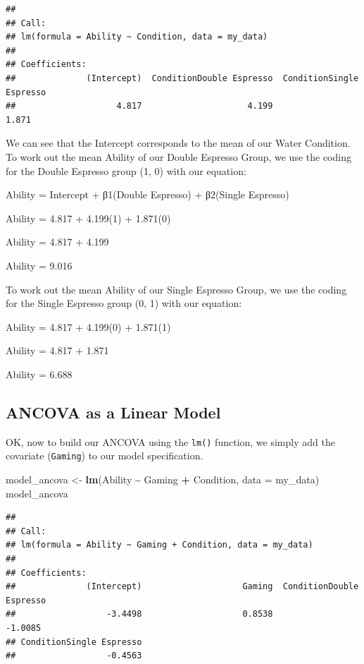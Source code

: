 \documentclass[
]{book}
\newenvironment{Shaded}{\begin{snugshade}}{\end{snugshade}}
\newcommand{\AttributeTok}[1]{\textcolor[rgb]{0.13,0.29,0.53}{#1}}
\newcommand{\FunctionTok}[1]{\textcolor[rgb]{0.13,0.29,0.53}{\textbf{#1}}}
\newcommand{\NormalTok}[1]{#1}
\newcommand{\OtherTok}[1]{\textcolor[rgb]{0.56,0.35,0.01}{#1}}
\newcommand{\SpecialCharTok}[1]{\textcolor[rgb]{0.81,0.36,0.00}{\textbf{#1}}}
\begin{document}
\begin{verbatim}
## 
## Call:
## lm(formula = Ability ~ Condition, data = my_data)
## 
## Coefficients:
##              (Intercept)  ConditionDouble Espresso  ConditionSingle Espresso  
##                    4.817                     4.199                     1.871
\end{verbatim}

We can see that the Intercept corresponds to the mean of our Water Condition. To work out the mean Ability of our Double Espresso Group, we use the coding for the Double Espresso group (1, 0) with our equation:

Ability = Intercept + β1(Double Espresso) + β2(Single Espresso)

Ability = 4.817 + 4.199(1) + 1.871(0)

Ability = 4.817 + 4.199

Ability = 9.016

To work out the mean Ability of our Single Espresso Group, we use the coding for the Single Espresso group (0, 1) with our equation:

Ability = 4.817 + 4.199(0) + 1.871(1)

Ability = 4.817 + 1.871

Ability = 6.688

\hypertarget{ancova-as-a-linear-model}{%
\subsection{ANCOVA as a Linear Model}\label{ancova-as-a-linear-model}}

OK, now to build our ANCOVA using the \texttt{lm()} function, we simply add the covariate (\texttt{Gaming}) to our model specification.

\begin{Shaded}
\begin{Highlighting}[]
\NormalTok{model\_ancova }\OtherTok{\textless{}{-}} \FunctionTok{lm}\NormalTok{(Ability }\SpecialCharTok{\textasciitilde{}}\NormalTok{ Gaming }\SpecialCharTok{+}\NormalTok{ Condition, }\AttributeTok{data =}\NormalTok{ my\_data)}
\NormalTok{model\_ancova}
\end{Highlighting}
\end{Shaded}

\begin{verbatim}
## 
## Call:
## lm(formula = Ability ~ Gaming + Condition, data = my_data)
## 
## Coefficients:
##              (Intercept)                    Gaming  ConditionDouble Espresso  
##                  -3.4498                    0.8538                   -1.0085  
## ConditionSingle Espresso  
##                  -0.4563
\end{verbatim}
\end{document}

